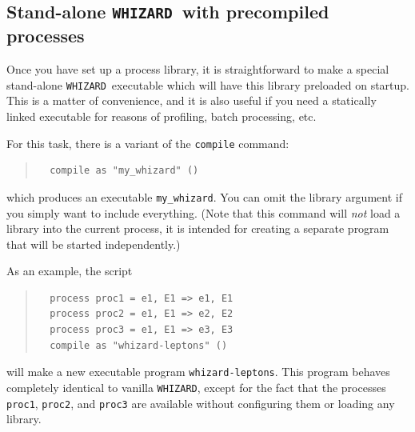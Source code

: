 \documentclass[12pt]{book}
\newcommand{\ttt}[1]{\texttt{#1}}
\newcommand{\whizard}{\ttt{WHIZARD}}
\begin{document}

\subsection{Stand-alone \whizard\ with precompiled processes}
\label{sec:static}

Once you have set up a process library, it is straightforward to make a
special stand-alone \whizard\ executable which will have this library
preloaded on startup.  This is a matter of convenience, and it is also useful
if you need a statically linked executable for reasons of profiling,
batch processing, etc.

For this task, there is a variant of the \ttt{compile} command:
\begin{quote}
\begin{footnotesize}
\begin{verbatim}
  compile as "my_whizard" ()
\end{verbatim}
\end{footnotesize}
\end{quote}
which produces an executable \verb|my_whizard|.  You can omit the library
argument if you simply want to include everything.  (Note that this command
will \emph{not} load a library into the current process, it is intended for
creating a separate program that will be started independently.)

As an example, the script
\begin{quote}
\begin{footnotesize}
\begin{verbatim}
  process proc1 = e1, E1 => e1, E1
  process proc2 = e1, E1 => e2, E2
  process proc3 = e1, E1 => e3, E3
  compile as "whizard-leptons" ()
\end{verbatim}
\end{footnotesize}
\end{quote}
will make a new executable program \verb|whizard-leptons|.  This
program behaves completely identical to vanilla \whizard, except for the fact
that the processes \ttt{proc1}, \ttt{proc2}, and \ttt{proc3} are available
without configuring them or loading any library.

\end{document}
